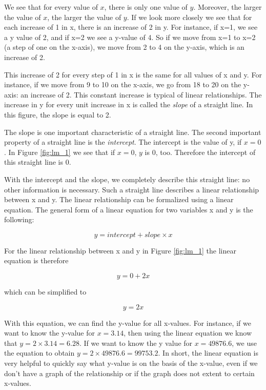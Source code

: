 \documentclass[]{report}\usepackage[]{graphicx}\usepackage[]{color}
\begin{document}
We see that for every value of $x$, there is only one value of $y$. Moreover, the larger the value of $x$, the larger the value of $y$. If we look more closely we see that for each increase of 1 in x, there is an increase of 2 in y. For instance, if x=1, we see a y value of 2, and if x=2 we see a y-value of 4. So if we move from x=1 to x=2 (a step of one on the x-axis), we move from 2 to 4 on the y-axis, which is an increase of 2.

This increase of 2 for every step of 1 in x is the same for all values of x and y. For instance, if we move from 9 to 10 on the x-axis, we go from 18 to 20 on the y-axis: an increase of 2. This constant increase is typical of linear relationships. The increase in y for every unit increase in x is called the \textit{slope} of a straight line. In this figure, the slope is equal to 2.

The slope is one important characteristic of a straight line. The second important property of a straight line is the \textit{intercept}. The intercept is the value of y, if $x=0$. In Figure \ref{fig:lm_1} we see that if $x=0$, $y$ is 0, too. Therefore the intercept of this straight line is 0.

With the intercept and the slope, we completely describe this straight line: no other information is necessary. Such a straight line describes a linear relationship between x and y. The linear relationship can be formalized using a linear equation. The general form of a linear equation for two variables x and y is the following:

\begin{equation}
y = intercept + slope \times x
\end{equation}


For the linear relationship between x and y in Figure \ref{fig:lm_1} the linear equation is therefore

\begin{equation}
y = 0 + 2 x
\end{equation}

which can be simplified to

\begin{equation}
y =  2 x
\end{equation}


With this equation, we can find the y-value for all x-values. For instance, if we want to know the y-value for $x=3.14$, then using the linear equation we know that $y = 2 \times 3.14 = 6.28$. If we want to know the y value for $x=49876.6$, we use the equation to obtain $y=2\times 49876.6 = 99753.2$. In short, the linear equation is very helpful to quickly say what y-value is on the basis of the x-value, even if we don't have a graph of the relationship or if the graph does not extent to certain x-values.
\end{document}
